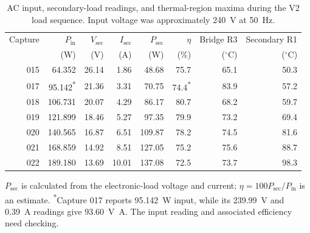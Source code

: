 \begin{table}[htbp]
\centering
\small
\setlength{\tabcolsep}{4pt}
\caption{AC input, secondary-load readings, and thermal-region maxima during the V2 load sequence. Input voltage was approximately \SI{240}{\volt} at \SI{50}{\hertz}.}
\label{tab:v2-secondary-load}
\begin{tabular}{@{}rrrrrrrr@{}}
\toprule
Capture & $P_{\mathrm{in}}$ & $V_{\mathrm{sec}}$ & $I_{\mathrm{sec}}$ & $P_{\mathrm{sec}}$ & $\eta$ & Bridge R3 & Secondary R1\\
 & (W) & (V) & (A) & (W) & (\%) & ($^\circ$C) & ($^\circ$C)\\
\midrule
015 & 64.352 & 26.14 & 1.86 & 48.68 & 75.7 & 65.1 & 50.3\\
017 & 95.142\textsuperscript{*} & 21.36 & 3.31 & 70.75 & 74.4\textsuperscript{*} & 83.9 & 57.2\\
018 & 106.731 & 20.07 & 4.29 & 86.17 & 80.7 & 68.2 & 59.7\\
019 & 121.899 & 18.46 & 5.27 & 97.35 & 79.9 & 73.2 & 69.4\\
020 & 140.565 & 16.87 & 6.51 & 109.87 & 78.2 & 74.5 & 81.6\\
021 & 168.859 & 14.92 & 8.51 & 127.05 & 75.2 & 75.6 & 88.7\\
022 & 189.180 & 13.69 & 10.01 & 137.08 & 72.5 & 73.7 & 98.3\\
\bottomrule
\end{tabular}
\par\vspace{0.4em}
\begin{minipage}{\linewidth}\footnotesize
$P_{\mathrm{sec}}$ is calculated from the electronic-load voltage and current; $\eta=100P_{\mathrm{sec}}/P_{\mathrm{in}}$ is an estimate.
\textsuperscript{*}Capture 017 reports \SI{95.142}{\watt} input, while its \SI{239.99}{\volt} and \SI{0.39}{\ampere} readings give \SI{93.60}{\volt\ampere}. The input reading and associated efficiency need checking.
\end{minipage}
\end{table}
